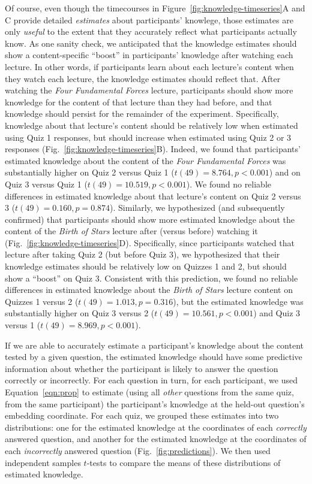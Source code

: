 \documentclass[10pt]{article}
\begin{document}
Of course, even though the timecourses in
Figure~\ref{fig:knowledge-timeseries}A and C provide detailed
\textit{estimates} about participants' knowlege, those estimates are only
\textit{useful} to the extent that they accurately reflect what participants
actually know. As one sanity check, we anticipated that the knowledge estimates
should show a content-specific ``boost'' in participants' knowledge after
watching each lecture. In other words, if participants learn about each
lecture's content when they watch each lecture, the knowledge estimates should
reflect that. After watching the \textit{Four Fundamental Forces} lecture,
participants should show more knowledge for the content of that lecture than
they had before, and that knowledge should persist for the remainder of the
experiment. Specifically, knowledge about that lecture's content should be
relatively low when estimated using Quiz 1 responses, but should increase when
estimated using Quiz 2 or 3 responses (Fig.~\ref{fig:knowledge-timeseries}B).
Indeed, we found that participants' estimated knowledge about the content of
the \textit{Four Fundamental Forces} was substantially higher on Quiz 2 versus
Quiz 1 ($t(49) = 8.764, p < 0.001$) and on Quiz 3 versus Quiz 1 ($t(49) = 10.519, p <
0.001$). We found no reliable differences in estimated knowledge about that
lecture's content on Quiz 2 versus 3 ($t(49) = 0.160, p = 0.874$). Similarly, we
hypothesized (and subsequently confirmed) that participants should show more
estimated knowledge about the content of the \textit{Birth of Stars} lecture
after (versus before) watching it (Fig.~\ref{fig:knowledge-timeseries}D).
Specifically, since participants watched that lecture after taking Quiz 2 (but
before Quiz 3), we hypothesized that their knowledge estimates should be
relatively low on Quizzes 1 and 2, but should show a ``boost'' on Quiz 3.
Consistent with this prediction, we found no reliable differences in estimated
knowledge about the \textit{Birth of Stars} lecture content on Quizzes 1 versus
2 ($t(49) = 1.013, p = 0.316$), but the estimated knowledge was substantially higher
on Quiz 3 versus 2 ($t(49) = 10.561, p < 0.001$) and Quiz 3 versus 1 ($t(49) = 8.969, p <
0.001$).

If we are able to accurately estimate a participant's knowledge about the
content tested by a given question, the estimated knowledge should have some
predictive information about whether the participant is likely to answer the
question correctly or incorrectly. For each question in turn, for each
participant, we used Equation~\ref{eqn:prop} to estimate (using all
\textit{other} questions from the same quiz, from the same participant) the
participant's knowledge at the held-out question's embedding coordinate. For
each quiz, we grouped these estimates into two distributions: one for the
estimated knowledge at the coordinates of each \textit{correctly} answered
question, and another for the estimated knowledge at the coordinates of each
\textit{incorrectly} answered question (Fig.~\ref{fig:predictions}). We then
used independent samples $t$-tests to compare the means of these distributions
of estimated knowledge.
\end{document}
